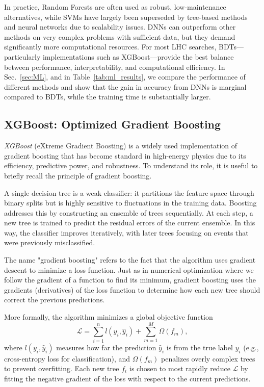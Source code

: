 In practice, Random Forests are often used as robust, low-maintenance alternatives, while SVMs have largely been superseded by tree-based methods and neural networks due to scalability issues. DNNs can outperform other methods on very complex problems with sufficient data, but they demand significantly more computational resources. For most LHC searches, BDTs—particularly implementations such as XGBoost—provide the best balance between performance, interpretability, and computational efficiency. In Sec.~\ref{sec:ML}, and in Table~\ref{tab:ml_results}, we compare the performance of different methods and show that the gain in accuracy from DNNs is marginal compared to BDTs, while the training time is substantially larger.


\subsection{XGBoost: Optimized Gradient Boosting}
\label{ssec:xgboost}

\textit{XGBoost} (eXtreme Gradient Boosting) is a widely used implementation of gradient boosting that has become standard in high-energy physics due to its efficiency, predictive power, and robustness. To understand its role, it is useful to briefly recall the principle of gradient boosting.

A single decision tree is a weak classifier: it partitions the feature space through binary splits but is highly sensitive to fluctuations in the training data. Boosting addresses this by constructing an ensemble of trees sequentially. At each step, a new tree is trained to predict the residual errors of the current ensemble. In this way, the classifier improves iteratively, with later trees focusing on events that were previously misclassified.

The name "gradient boosting" refers to the fact that the algorithm uses gradient descent to minimize a loss function. Just as in numerical optimization where we follow the gradient of a function to find its minimum, gradient boosting uses the gradients (derivatives) of the loss function to determine how each new tree should correct the previous predictions.

More formally, the algorithm minimizes a global objective function
\begin{equation}
\mathcal{L} = \sum_{i=1}^{n} l(y_i, \hat{y}_i) + \sum_{m=1}^{M} \Omega(f_m),
\end{equation}
where $l(y_i, \hat{y}_i)$ measures how far the prediction $\hat{y}_i$ is from the true label $y_i$ (e.g., cross-entropy loss for classification), and $\Omega(f_m)$ penalizes overly complex trees to prevent overfitting. Each new tree $f_t$ is chosen to most rapidly reduce $\mathcal{L}$ by fitting the negative gradient of the loss with respect to the current predictions.

